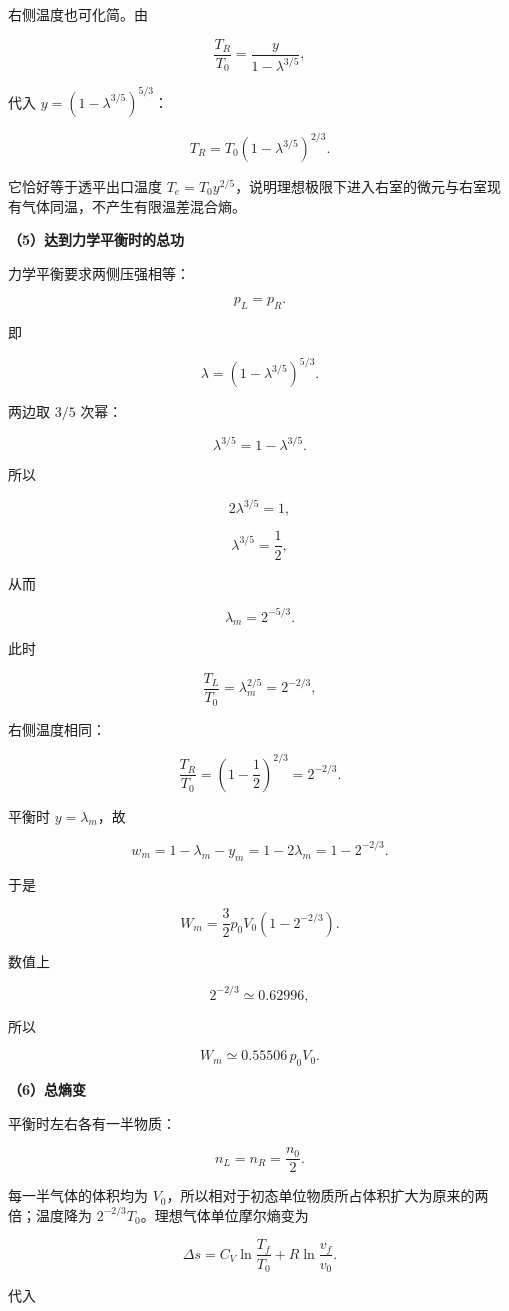 \documentclass[12pt,a4paper,UTF8]{ctexart}
\begin{document}
右侧温度也可化简。由

\[
\frac{T_R}{T_0}
=\frac{y}{1-\lambda^{3/5}},
\]

代入 \(y=(1-\lambda^{3/5})^{5/3}\)：

\[
\boxed{
T_R=T_0\left(1-\lambda^{3/5}\right)^{2/3}
}.
\]

它恰好等于透平出口温度
\(T_e=T_0y^{2/5}\)，说明理想极限下进入右室的微元与右室现有气体同温，不产生有限温差混合熵。

\textbf{（5）达到力学平衡时的总功}

力学平衡要求两侧压强相等：

\[p_L=p_R.\]

即

\[
\lambda=\left(1-\lambda^{3/5}\right)^{5/3}.
\]

两边取 \(3/5\) 次幂：

\[
\lambda^{3/5}=1-\lambda^{3/5}.
\]

所以

\[
2\lambda^{3/5}=1,
\]

\[
\lambda^{3/5}=\frac12,
\]

从而

\[
\boxed{\lambda_m=2^{-5/3}}.
\]

此时

\[
\frac{T_L}{T_0}=\lambda_m^{2/5}
=2^{-2/3},
\]

右侧温度相同：

\[
\frac{T_R}{T_0}
=\left(1-\frac12\right)^{2/3}
=2^{-2/3}.
\]

平衡时 \(y=\lambda_m\)，故

\[
w_m=1-\lambda_m-y_m
=1-2\lambda_m
=1-2^{-2/3}.
\]

于是

\[
\boxed{
W_m=\frac32p_0V_0
\left(1-2^{-2/3}\right)
}.
\]

数值上

\[
2^{-2/3}\simeq0.62996,
\]

所以

\[W_m\simeq0.55506\,p_0V_0.\]

\textbf{（6）总熵变}

平衡时左右各有一半物质：

\[n_L=n_R=\frac{n_0}{2}.\]

每一半气体的体积均为
\(V_0\)，所以相对于初态单位物质所占体积扩大为原来的两倍；温度降为
\(2^{-2/3}T_0\)。理想气体单位摩尔熵变为

\[
\Delta s=C_V\ln\frac{T_f}{T_0}
+R\ln\frac{v_f}{v_0}.
\]

代入
\end{document}
